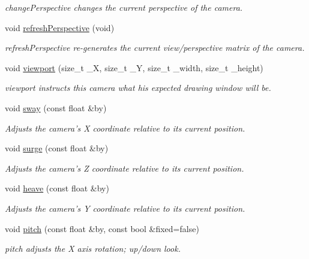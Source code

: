 \begin{DoxyCompactItemize}
\begin{DoxyCompactList}\small\item\em change\-Perspective changes the current perspective of the camera. \end{DoxyCompactList}\item 
void \hyperlink{class_camera_a24c5346fc0dfaa93257b6716fe0f2421}{refresh\-Perspective} (void)
\begin{DoxyCompactList}\small\item\em refresh\-Perspective re-\/generates the current view/perspective matrix of the camera. \end{DoxyCompactList}\item 
void \hyperlink{class_camera_adda458a9212825164b52019597f2e9c8}{viewport} (size\-\_\-t \-\_\-\-X, size\-\_\-t \-\_\-\-Y, size\-\_\-t \-\_\-width, size\-\_\-t \-\_\-height)
\begin{DoxyCompactList}\small\item\em viewport instructs this camera what his expected drawing window will be. \end{DoxyCompactList}\item 
void \hyperlink{class_camera_abbe6fe82ed05e64e35b0c4ed2001b34e}{sway} (const float \&by)
\begin{DoxyCompactList}\small\item\em Adjusts the camera's X coordinate relative to its current position. \end{DoxyCompactList}\item 
void \hyperlink{class_camera_abb2251df65445bf8efd3fe0074fb5033}{surge} (const float \&by)
\begin{DoxyCompactList}\small\item\em Adjusts the camera's Z coordinate relative to its current position. \end{DoxyCompactList}\item 
void \hyperlink{class_camera_a2148d751f104d8e39c9832e2372df2d9}{heave} (const float \&by)
\begin{DoxyCompactList}\small\item\em Adjusts the camera's Y coordinate relative to its current position. \end{DoxyCompactList}\item 
void \hyperlink{class_camera_aac7dbb6201be7f17e014fc6fdf915560}{pitch} (const float \&by, const bool \&fixed=false)
\begin{DoxyCompactList}\small\item\em pitch adjusts the X axis rotation; up/down look. \end{DoxyCompactList}\item 

\end{DoxyCompactItemize}
